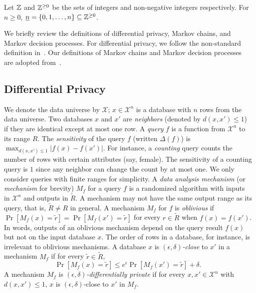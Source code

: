 
Let $\mathbb{Z}$ and $\mathbb{Z}^{\geq 0}$ be the sets of integers and
non-negative integers respectively. For $n \geq 0$, $\underline{n} =
\{ 0, 1, \ldots, n \} \subseteq \mathbb{Z}^{\geq 0}$.

We briefly review the definitions of differential privacy, Markov
chains, and Markov decision processes. For differential privacy, we
follow the non-standard  definition in~\cite{GRS:09:UUPM,GRS:12:UUPM}. Our
definitions of Markov chains and Markov decision processes are adopted
from~\cite{BK:08:PMC}.

\subsection{Differential Privacy}

We denote the data universe by $\mathcal{X}$; $x \in \mathcal{X}^n$ is
a database with $n$ rows from the data universe. Two databases $x$ and
$x'$ are \emph{neighbors} (denoted by $d(x, x') \leq 1$) if they are
identical except at most one row. A \emph{query} $f$ is a function
from $\mathcal{X}^n$ to its range $R$. The \emph{sensitivity} of the
query $f$ (written $\Delta (f)$) is $\max_{d(x, x') \leq 1} | f (x) -
f (x') |$. For instance, a \emph{counting} query counts the number
of rows with certain attributes (say, female). The sensitivity of a
counting query is $1$ since any neighbor can change the count by at
most one. We only consider queries with finite  ranges for simplicity.
A \emph{data analysis mechanism} (or
\emph{mechanism} for brevity) $M_f$ for a query $f$
is a randomized algorithm with inputs in $\mathcal{X}^n$ and outputs
in $\tilde{R}$.
A mechanism may not have the same output range as its query, that is,
$\tilde{R} \neq R$ in general.
A mechanism $M_f$ for $f$ is \emph{oblivious} if
$\Pr[M_f(x) = \tilde{r}] = \Pr[M_f(x') = \tilde{r}]$ for every
$r \in \tilde{R}$ when $f (x) = f (x')$. In words, outputs of an
oblivious mechanism depend on the query result $f (x)$ but not on the
input database $x$. The order of rows in a database, for instance, is
irrelevant to oblivious mechanisms. A database $x$ is
\emph{$(\epsilon, \delta)$-close} to $x'$ in a mechanism
$M_f$ if for every $\tilde{r} \in \tilde{R}$,
\[
\Pr[M_f (x) = \tilde{r}] \leq e^{\epsilon} \Pr[M_f (x') =
\tilde{r}] + \delta.
\]
A mechanism $M_f$ is \emph{$(\epsilon, \delta)$-differentially
  private} %
if for every $x, x' \in \mathcal{X}^n$ with $d(x, x') \leq 1$,
$x$ is $(\epsilon, \delta)$-close to $x'$ in $M_f$.

